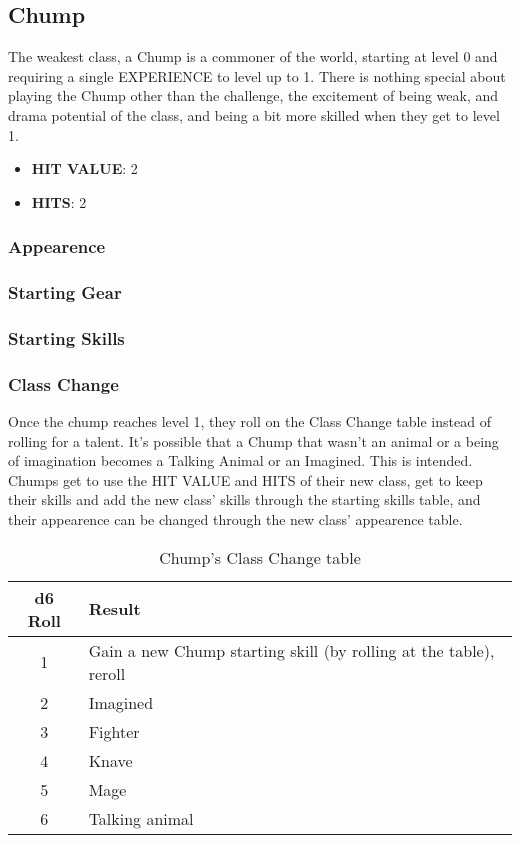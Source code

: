 \subsection{Chump}
The weakest class, a Chump is a commoner of the world, starting at level 0 and requiring a single EXPERIENCE to level up to 1. There is nothing special about playing the Chump other than the challenge, the excitement of being weak, and drama potential of the class, and being a bit more skilled when they get to level 1.

\begin{multicols}[2]
\begin{itemize}
  \item \textbf{HIT VALUE}: 2
  \item \textbf{HITS}: 2
\end{itemize}

\subsubsection*{Appearence}


\subsubsection*{Starting Gear}


\subsubsection*{Starting Skills}


\subsubsection*{Class Change}
Once the chump reaches level 1, they roll on the Class Change table instead of rolling for a talent. It's possible that a Chump that wasn't an animal or a being of imagination becomes a Talking Animal or an Imagined. This is intended. Chumps get to use the HIT VALUE and HITS of their new class, get to keep their skills and add the new class' skills through the starting skills table, and their appearence can be changed through the new class' appearence table.

\end{multicols}

\begin{table}[b!]
\centering
\begin{tabular}{|c|l|}
\hline
\textbf{d6 Roll} & \textbf{Result} \\
\hline
1 & Gain a new Chump starting skill (by rolling at the table), reroll \\
2 & Imagined \\
3 & Fighter \\
4 & Knave \\
5 & Mage \\
6 & Talking animal \\
\hline
\end{tabular}
\caption{Chump's Class Change table}
\label{tab:chump_change}
\end{table}
